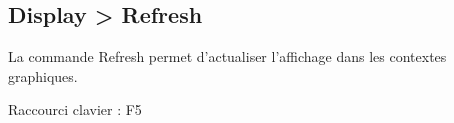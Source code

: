 \subsection{Display > Refresh}
\label{subsection:resfresh}

La commande Refresh permet d'actualiser l'affichage dans les contextes graphiques.\\
\par
\textcolor[rgb]{1.00,0.00,0.00}{Raccourci clavier : F5}
